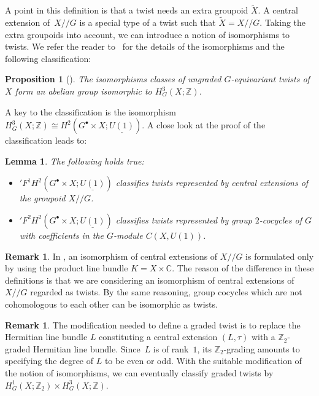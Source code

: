 \documentclass[pdftex]{sigma}
\newtheorem{prop}[thm]{Proposition}
\newtheorem{lem}[thm]{Lemma}
\theoremstyle{definition}
\newtheorem{rem}[thm]{Remark}
\newcommand{\C}{\mathbb{C}}
\newcommand{\Z}{\mathbb{Z}}
\begin{document}
A point in this def\/inition is that a twist needs an extra groupoid $\tilde{X}$. A central extension of~$X/\!/G$ is a special type of a twist such that $\tilde{X} = X/\!/G$. Taking the extra groupoids into account, we can introduce a notion of isomorphisms to twists. We refer the reader to~\cite{FHT} for the details of the isomorphisms and the following classif\/ication:

\begin{prop}[\cite{FHT}]
The isomorphisms classes of ungraded $G$-equivariant twists of $X$ form an abelian group isomorphic to $H^3_G(X; \Z)$.
\end{prop}

A key to the classif\/ication is the isomorphism $H^3_G(X; \Z) \cong H^2(G^\bullet \times X; \underline{U(1)})$. A close look at the proof of the classif\/ication leads to:

\begin{lem} \label{lem:twist_interpretation_preliminary}
The following holds true:
\begin{itemize}\itemsep=0pt
\item[$(i)$]
${}'F^1H^2(G^\bullet \times X; \underline{U(1)})$ classifies twists represented by central extensions of the groupoid $X/\!/G$.

\item[$(ii)$]
${}'F^2H^2(G^\bullet \times X; \underline{U(1)})$ classifies twists represented by group $2$-cocycles of $G$ with coefficients in the $G$-module $C(X, U(1))$.
\end{itemize}
\end{lem}

\begin{rem}
In \cite{F-M}, an isomorphism of central extensions of $X/\!/G$ is formulated only by using the product line bundle $K = X \times \C$. The reason of the dif\/ference in these def\/initions is that we are considering an isomorphism of central extensions of $X/\!/G$ regarded as twists. By the same reasoning, group cocycles which are not cohomologous to each other can be isomorphic as twists.
\end{rem}

\begin{rem} \label{rem:graded_twist}
The modif\/ication needed to def\/ine a graded twist is to replace the Hermitian line bundle $L$ constituting a central extension $(L, \tau)$ with a $\Z_2$-graded Hermitian line bundle. Since~$L$ is of rank~$1$, its $\Z_2$-grading amounts to specifying the degree of $L$ to be even or odd. With the suitable modif\/ication of the notion of isomorphisms, we can eventually classify graded twists by $H^1_G(X; \Z_2) \times H^3_G(X; \Z)$.
\end{rem}
\end{document}
